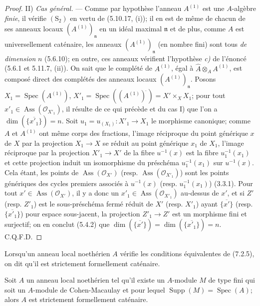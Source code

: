 \begin{proof}
\medskip\noindent
II) \emph{Cas général.} --- Comme par hypothèse l'anneau $A^{(1)}$ est une
$A$-algèbre \emph{finie}, il vérifie $(\mathrm S_2)$ en vertu de (5.10.17, (i));
il en est de même de chacun de ses anneaux locaux
$(A^{(1)})_{\mathfrak n}$ en un idéal maximal $\mathfrak n$ et de plus,
comme $A$ est universellement caténaire, les anneaux
$(A^{(1)})_{\mathfrak n}$ (en nombre fini) sont tous \emph{de dimension}
$n$ (5.6.10); en outre, ces anneaux vérifient l'hypothèse \emph{c)} de l'énoncé
(5.6.1 et 5.11.7, (ii)). On sait que le complété de $A^{(1)}$, égal à
$\widehat A\otimes_AA^{(1)}$, est composé direct des complétés des anneaux
locaux $(A^{(1)})_{\mathfrak n}$. Posons
$X_1=\operatorname{Spec}(A^{(1)})$,
$X'_1=\operatorname{Spec}((A^{(1)})^{\widehat{\,}})=X'\times_XX_1$; pour tout
$x'_1\in\operatorname{Ass}(\mathscr O_{X'_1})$, il résulte de ce qui
précède et du cas I) que l'on a $\dim(\overline{\{x'_1\}})=n$. Soit
$u_1=u_{(X_1)}:X'_1\to X_1$ le morphisme canonique; comme $A$ et $A^{(1)}$
ont même corps des fractions, l'image réciproque du point générique $x$ de
$X$ par la projection $X_1\to X$ se réduit au point générique $x_1$ de
$X_1$, l'image réciproque par la projection $X'_1\to X'$ de la fibre
$u^{-1}(x)$ est la fibre $u_1^{-1}(x_1)$ et cette projection induit un
isomorphisme du préschéma $u_1^{-1}(x_1)$ sur $u^{-1}(x)$. Cela étant, les
points de $\operatorname{Ass}(\mathscr O_{X'})$ (resp.
$\operatorname{Ass}(\mathscr O_{X'_1})$) sont les points génériques des
cycles premiers associés à $u^{-1}(x)$ (resp. $u_1^{-1}(x_1)$) (3.3.1).
Pour tout $x'\in\operatorname{Ass}(\mathscr O_{X'})$, il y a donc un
$x'_1\in\operatorname{Ass}(\mathscr O_{X'_1})$ au-dessus de $x'$, et si
$Z'$ (resp. $Z'_1$) est le sous-préschéma fermé réduit de $X'$ (resp.
$X'_1$) ayant $\overline{\{x'\}}$ (resp. $\overline{\{x'_1\}}$) pour
espace sous-jacent, la projection $Z'_1\to Z'$ est un morphisme fini et
surjectif; on en conclut (5.4.2) que
$\dim(\overline{\{x'\}})=\dim(\overline{\{x'_1\}})=n$. C.Q.F.D.
\end{proof}

\begin{definition}[7.2.6]
\label{IV.2.s7.2.6-fr}
Lorsqu'un anneau local noethérien $A$ vérifie les conditions équivalentes de
\textup{(7.2.5)}, on dit qu'il est strictement formellement caténaire.
\end{definition}


\begin{corollary}[7.2.7]
\label{IV.2.s7.2.7-fr}
Soit $A$ un anneau local noethérien tel qu'il existe un $A$-module $M$ de
type fini qui soit un $A$-module de Cohen-Macaulay et pour lequel
$\operatorname{Supp}(M)=\operatorname{Spec}(A)$; alors $A$ est strictement
formellement caténaire.
\end{corollary}

